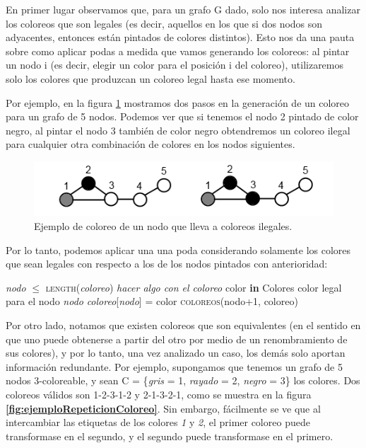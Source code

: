 En primer lugar observamos que, para un grafo G dado, solo nos interesa analizar los coloreos que son legales (es decir, aquellos en los que si dos nodos son adyacentes, entonces est\'an pintados de colores distintos). Esto nos da una pauta sobre como aplicar podas a medida que vamos generando los coloreos: al pintar un nodo i (es decir, elegir un color para el posici\'on i del coloreo), utilizaremos solo los colores que produzcan un coloreo legal hasta ese momento.

Por ejemplo, en la figura \ref{fig:ejemploSoloColoreosNoValidos} mostramos dos pasos en la generaci\'on de un coloreo para un grafo de 5 nodos. Podemos ver que si tenemos el nodo 2 pintado de color negro, al pintar el nodo 3 tambi\'en de color negro obtendremos un coloreo ilegal para cualquier otra combinaci\'on de colores en los nodos siguientes. 

\begin{figure}[H]
	\centering
	\includegraphics[scale=1]{ejemplo-coloreos-no-validos.png}
\caption{Ejemplo de coloreo de un nodo que lleva a coloreos ilegales.}
\label{fig:ejemploSoloColoreosNoValidos}
\end{figure}

Por lo tanto, podemos aplicar una una poda considerando solamente los colores que sean legales con respecto a los de los nodos pintados con anterioridad:

\begin{algorithm}[H]
\caption{} 
\begin{codebox}
\li \If \textit{nodo} $\leq$ \textsc{length}(\textit{coloreo}) \Do
\li 		\textsl{hacer algo con el coloreo}		
		\End
\li	\Else \Do
\li			\For color \textbf{in} Colores \Do
\li		 		\If color legal para el nodo \textsl{nodo}\Do	
\li					\textit{coloreo}[\textit{nodo}] = color
\li					\textsc{coloreos}(nodo+1, coloreo)	
					\End
				\End
		\End
\End
\end{codebox}
\end{algorithm}
 
Por otro lado, notamos que existen coloreos que son equivalentes (en el sentido en que uno puede obtenerse a partir del otro por medio de un renombramiento de sus colores), y por lo tanto, una vez analizado un caso, los dem\'as solo aportan informaci\'on redundante. 
Por ejemplo, supongamos que tenemos un grafo de 5 nodos 3-coloreable, y sean C = \{\textsl{gris} = 1, \textsl{rayado} = 2, \textsl{negro} = 3\} los colores. 
Dos coloreos v\'alidos son 1-2-3-1-2 y 2-1-3-2-1, como se muestra en la figura \textbf{\ref{fig:ejemploRepeticionColoreo}}. 
Sin embargo, f\'acilmente se ve que al intercambiar las etiquetas de los colores \textsl{1} y \textsl{2}, el primer coloreo puede transformase en el segundo, y el segundo puede transformase en el primero. 

